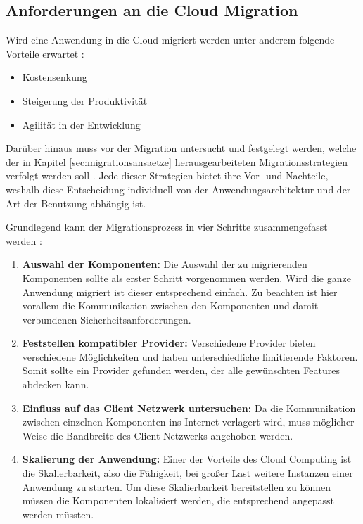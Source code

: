 \subsection{Anforderungen an die Cloud Migration}
Wird eine Anwendung in die Cloud migriert werden unter anderem folgende Vorteile erwartet \cite[Vgl. auch im Folgenden][03:23-05:36min]{AWS2019}:
\begin{itemize}
\item Kostensenkung
\item Steigerung der Produktivität
\item Agilität in der Entwicklung
\end{itemize}

Darüber hinaus muss vor der Migration untersucht und festgelegt werden, welche der in Kapitel \ref{sec:migrationsansaetze} herausgearbeiteten Migrationsstrategien verfolgt werden soll \cite[Vgl.][10:38-13:23min]{AWS2019}. Jede dieser Strategien bietet ihre Vor- und Nachteile, weshalb diese Entscheidung individuell von der Anwendungsarchitektur und der Art der Benutzung abhängig ist. \pagebreak

Grundlegend kann der Migrationsprozess  in vier Schritte zusammengefasst werden \cite[Vgl. auch im Folgenden][S. 34f]{Maenhaut2016}:
\begin{enumerate}
\item \textbf{Auswahl der Komponenten:} Die Auswahl der zu migrierenden Komponenten sollte als erster Schritt vorgenommen werden. Wird die ganze Anwendung migriert ist dieser entsprechend einfach. Zu beachten ist hier vorallem die Kommunikation zwischen den Komponenten und damit verbundenen Sicherheitsanforderungen.
\item \textbf{Feststellen kompatibler Provider:} Verschiedene Provider bieten verschiedene Möglichkeiten und haben unterschiedliche limitierende Faktoren. Somit sollte ein Provider gefunden werden, der alle gewünschten Features abdecken kann.
\item \textbf{Einfluss auf das Client Netzwerk untersuchen:} Da die Kommunikation zwischen einzelnen Komponenten ins Internet verlagert wird, muss möglicher Weise die Bandbreite des Client Netzwerks angehoben werden.
\item \textbf{Skalierung der Anwendung:} Einer der Vorteile des Cloud Computing ist die Skalierbarkeit, also die Fähigkeit, bei großer Last weitere Instanzen einer Anwendung zu starten. Um diese Skalierbarkeit bereitstellen zu können müssen die Komponenten lokalisiert werden, die entsprechend angepasst werden müssten.
\end{enumerate}

